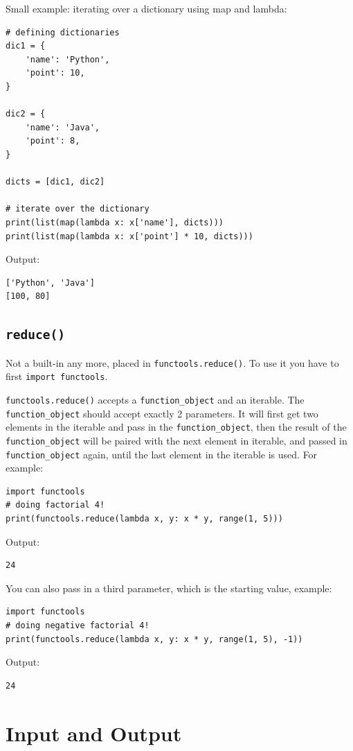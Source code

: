 \documentclass[12pt]{book}
\begin{document}
Small example: iterating over a dictionary using map and lambda:
\begin{verbatim}
# defining dictionaries
dic1 = {
    'name': 'Python',
    'point': 10,
}

dic2 = {
    'name': 'Java',
    'point': 8,
}

dicts = [dic1, dic2]

# iterate over the dictionary
print(list(map(lambda x: x['name'], dicts)))
print(list(map(lambda x: x['point'] * 10, dicts)))
\end{verbatim}
Output:
\begin{verbatim}
['Python', 'Java']
[100, 80]
\end{verbatim}
\section{\texttt{reduce()}}
\label{sec:org9b497cb}
Not a built-in any more, placed in \texttt{functools.reduce()}. To use it you have to first \texttt{import functools}.

\texttt{functools.reduce()} accepts a \texttt{function\_object} and an iterable. The \texttt{function\_object} should accept exactly 2 parameters. It will first get two elements in the iterable and pass in the \texttt{function\_object}, then the result of the \texttt{function\_object} will be paired with the next element in iterable, and passed in \texttt{function\_object} again, until the last element in the iterable is used. For example:
\begin{verbatim}
import functools
# doing factorial 4!
print(functools.reduce(lambda x, y: x * y, range(1, 5)))
\end{verbatim}
Output:
\begin{verbatim}
24
\end{verbatim}

You can also pass in a third parameter, which is the starting value, example:
\begin{verbatim}
import functools
# doing negative factorial 4!
print(functools.reduce(lambda x, y: x * y, range(1, 5), -1))
\end{verbatim}
Output:
\begin{verbatim}
24
\end{verbatim}

\chapter{Input and Output}
\label{sec:org602304d}
\end{document}
